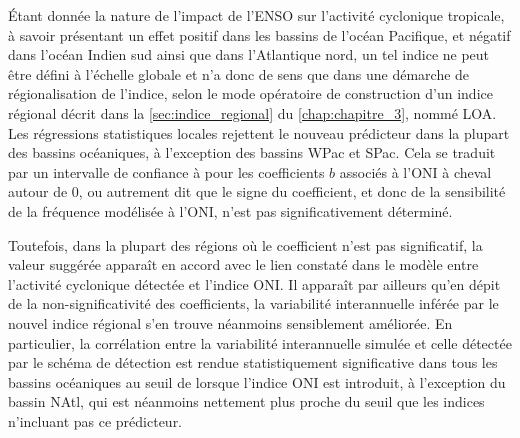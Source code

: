 \documentclass[../main.tex]{subfiles}
\begin{document}
Étant donnée la nature de l'impact de l'ENSO sur l'activité cyclonique tropicale, à savoir présentant un effet positif dans les bassins de l'océan Pacifique, et
négatif dans l'océan Indien sud ainsi que dans l'Atlantique nord, un tel indice ne peut être défini à l'échelle globale et n'a donc de sens que dans une
démarche de régionalisation de l'indice, selon le mode opératoire de construction d'un indice régional décrit dans la \cref{sec:indice_regional} du
\cref{chap:chapitre_3}, nommé LOA. Les régressions statistiques locales rejettent le nouveau prédicteur dans la plupart des bassins océaniques, à l'exception
des bassins WPac et SPac. Cela se traduit par un intervalle de confiance à  pour les coefficients $b$ associés à l'ONI à cheval autour de \num{0}, ou
autrement dit que le signe du coefficient, et donc de la sensibilité de la fréquence modélisée à l'ONI, n'est pas significativement déterminé.

Toutefois, dans la plupart des régions où le coefficient n'est pas significatif, la valeur suggérée apparaît en accord avec le lien constaté dans le modèle
entre l'activité cyclonique détectée et l'indice ONI. Il apparaît par ailleurs qu'en dépit de la non-significativité des coefficients, la variabilité
interannuelle inférée par le nouvel indice régional s'en trouve néanmoins sensiblement améliorée. En particulier, la corrélation entre la variabilité
interannuelle simulée et celle détectée par le schéma de détection est rendue statistiquement significative dans tous les bassins océaniques au seuil de
 lorsque l'indice ONI est introduit, à l'exception du bassin NAtl, qui est néanmoins nettement plus proche du seuil que les indices n'incluant pas ce
prédicteur.
\end{document}
